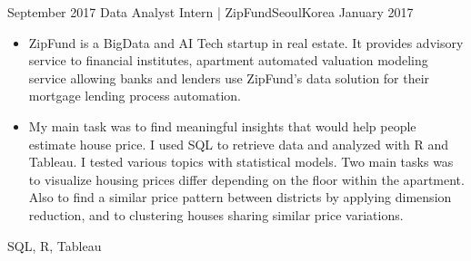 \begin{experiences}
  
 \experience
    {September 2017} {Data Analyst Intern | ZipFund}{Seoul}{Korea}
    {January 2017}    {\begin{itemize}
               \item ZipFund is a BigData and AI Tech startup in real estate. It provides advisory service to financial institutes, apartment automated valuation modeling service allowing banks and lenders use ZipFund's data solution for their mortgage lending process automation.

               \item  My main task was to find meaningful insights that would help people estimate house price. I used SQL to retrieve data and analyzed with R and Tableau. I tested various topics with statistical models. Two main tasks was to visualize housing prices differ depending on the floor within the apartment. Also to find a similar price pattern between districts by applying dimension reduction, and to clustering houses sharing similar price variations. 
               \end{itemize}}
            {SQL, R, Tableau}
  \emptySeparator
  
  
  
  
\end{experiences}
